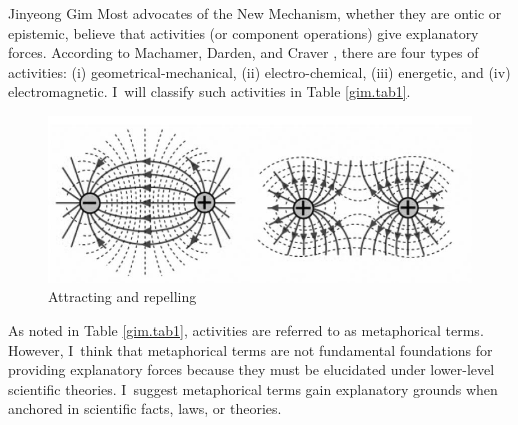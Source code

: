 \begin{artengenv}{Jinyeong Gim}
Most advocates of the New Mechanism, whether they are ontic or epistemic, believe that activities (or component operations) give explanatory forces. According to Machamer, Darden, and Craver
\parencite*[][p.14]{machamer_thinking_2000}, %
 there are four types of activities: (i) geometrical-mechanical, (ii) electro-chemical, (iii) energetic, and (iv) electromagnetic. I~will classify such activities in Table \ref{gim.tab1}.


\begin{table}[]
\caption{Types of activities.}
\label{gim.tab1}
\end{table}

\begin{figure}[H]
 \begin{center}
 \includegraphics[width=.8\textwidth]{ART_Gim/fig.5300.jpg}%
 \end{center}%
 \caption{Attracting and repelling}\label{gim.fig5}
\end{figure}


As noted in Table \ref{gim.tab1}, activities are referred to as metaphorical terms. However, I~think that metaphorical terms are not fundamental foundations for providing explanatory forces because they must be elucidated under lower-level scientific theories. I~suggest metaphorical terms gain explanatory grounds when anchored in scientific facts, laws, or theories.


\end{artengenv}
